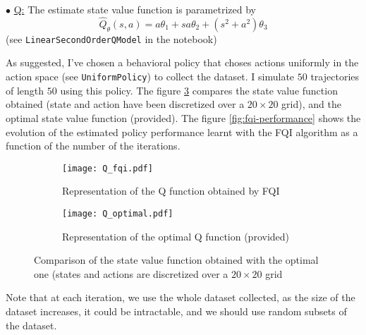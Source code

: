 \documentclass[a4paper, 11pt]{article}
\newcounter{cquestion}
\renewcommand{\thecquestion}{\arabic{cquestion}}
\newenvironment{question}
{\par \vspace{0.5em} \noindent \stepcounter{cquestion} \hspace{-1em}
 $\bullet$ \underline{Q\thecquestion :}}
{}
\begin{document}
\begin{question}
  The estimate state value function is parametrized by
  \begin{displaymath}
    \hat{Q}_\theta (s, a) = a \theta_1 + s a \theta_2 + (s^2 + a^2) \theta_3
  \end{displaymath}
  (see \verb+LinearSecondOrderQModel+ in the notebook)

  As suggested, I've chosen a behavioral policy that choses actions
  uniformly in the action space (see \verb+UniformPolicy+) to collect
  the dataset. I simulate $50$ trajectories of length $50$ using this
  policy. The figure \ref{fig:Q-comparison} compares the state
  value function obtained (state and action have been discretized over
  a $20 \times 20$ grid), and the optimal state value function
  (provided). The figure \ref{fig:fqi-performance} shows the evolution
  of the estimated policy performance learnt with the FQI algorithm as
  a function of the number of the iterations.

  \begin{figure}[h!]
    \centering
    \begin{subfigure}[t]{0.48\textwidth}
      \centering
      \texttt{[image: Q\_fqi.pdf]}
      \caption{Representation of the Q function obtained by
        FQI}\label{fig:Q-fqi.pdf}
    \end{subfigure}
    \quad
    \begin{subfigure}[t]{0.48\textwidth}
      \centering
      \texttt{[image: Q\_optimal.pdf]}
      \caption{Representation of the optimal Q function
        (provided)}\label{fig:Q-optimal.pdf}
    \end{subfigure}
    \caption{Comparison of the state value function obtained with the
      optimal one (states and actions are discretized over a
      $20 \times 20$ grid}\label{fig:Q-comparison}
  \end{figure}


  Note that at each iteration, we use the whole dataset collected, as
  the size of the dataset increases, it could be intractable, and we
  should use random subsets of the dataset.




\end{question}
\end{document}
